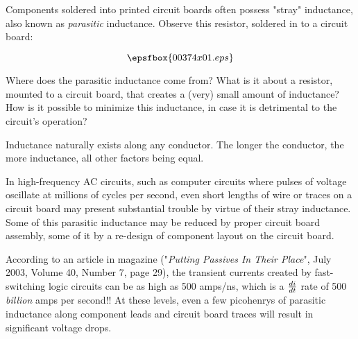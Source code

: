 

Components soldered into printed circuit boards often possess "stray" inductance, also known as {\it parasitic} inductance.  Observe this resistor, soldered in to a circuit board:

$$\epsfbox{00374x01.eps}$$

Where does the parasitic inductance come from?  What is it about a resistor, mounted to a circuit board, that creates a (very) small amount of inductance?  How is it possible to minimize this inductance, in case it is detrimental to the circuit's operation?







Inductance naturally exists along any conductor.  The longer the conductor, the more inductance, all other factors being equal.







In high-frequency AC circuits, such as computer circuits where pulses of voltage oscillate at millions of cycles per second, even short lengths of wire or traces on a circuit board may present substantial trouble by virtue of their stray inductance.  Some of this parasitic inductance may be reduced by proper circuit board assembly, some of it by a re-design of component layout on the circuit board.

According to an article in  magazine ("{\it Putting Passives In Their Place}", July 2003, Volume 40, Number 7, page 29), the transient currents created by fast-switching logic circuits can be as high as 500 amps/ns, which is a $di \over dt$ rate of 500 {\it billion} amps per second!!  At these levels, even a few picohenrys of parasitic inductance along component leads and circuit board traces will result in significant voltage drops.




